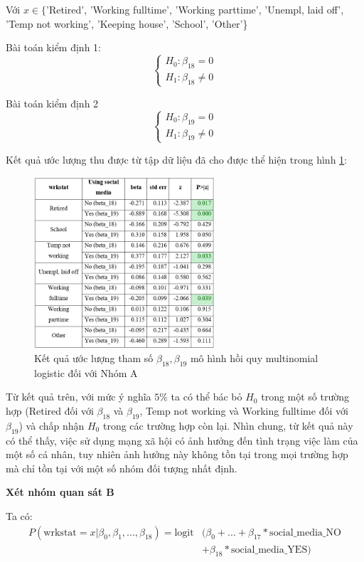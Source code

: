 Với $x \in\{$'Retired', 'Working fulltime', 'Working parttime', 'Unempl, laid off', 'Temp not working', 'Keeping house', 'School', 'Other'\}

Bài toán kiểm định 1:
$$
\left\{\begin{array}{l}
H_{0}: \beta_{18}=0 \\
H_{1}: \beta_{18} \neq 0
\end{array}\right.
$$

Bài toán kiểm định 2
$$
\left\{\begin{array}{l}
H_{0}: \beta_{19}=0 \\
H_{1}: \beta_{19} \neq 0
\end{array}\right.
$$

Kết quả ước lượng thu được từ tập dữ liệu đã cho được thể hiện trong hình \ref{fig:beta1819}:

\begin{figure}[h!]
    \centering
    \includegraphics[width=0.6\textwidth]{figures/beta1819.png}
    \caption{Kết quả ước lượng tham số $\beta_{18}, \beta_{19}$ mô hình hồi quy multinomial logistic đối với Nhóm A}
    \label{fig:beta1819}
\end{figure}

Từ kết quả trên, với mức ý nghĩa $5 \%$ ta có thể bác bỏ $H_{0}$ trong một số trường hợp (Retired đối với $\beta_{18}$ và $\beta_{19}$, Temp not working và Working fulltime đối với $\beta_{19}$) và chấp nhận $H_{0}$ trong các trường hợp còn lại. Nhìn chung, từ kết quả này có thể thấy, việc sử dụng mạng xã hội có ảnh hưởng đến tình trạng việc làm của một số cá nhân, tuy nhiên ảnh hưởng này không tồn tại trong mọi trường hợp mà chỉ tồn tại với một số nhóm đối tượng nhất định.


\textbf{Xét nhóm quan sát B}

Ta có:
\begin{equation*}
\begin{aligned}
P(\mathrm{wrkstat} = x \vert \beta_0, \beta_1,..., \beta_{18}) = \mathrm{logit}&(\beta_0 + ... + \beta_{17} * \text{social\_media\_NO} \\
   & + \beta_{18} * \text{social\_media\_YES})
\end{aligned}
\end{equation*}

